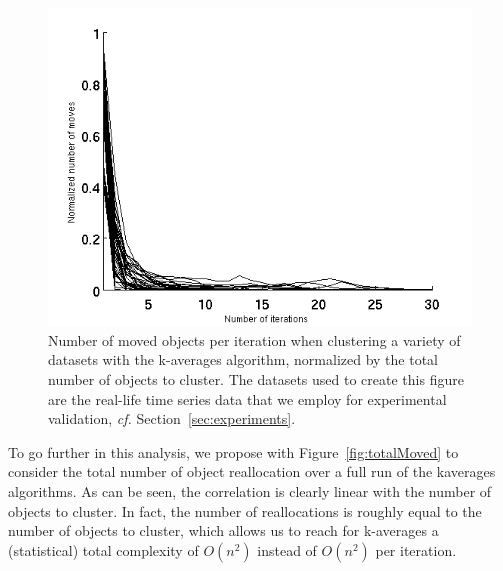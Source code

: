 \documentclass[a4paper,twoside]{article}
\begin{document}
\begin{figure}
\center
\includegraphics[scale=0.6]{figures/iterMove.png} 
\caption{Number of moved objects per iteration when clustering a variety of datasets with the k-averages algorithm, normalized by the total number of objects to cluster. The datasets used to create this figure are the real-life time series data that we employ for experimental validation, \textit{cf.} Section~\ref{sec:experiments}.}
\label{fig:moved}
\end{figure}

To go further in this analysis, we propose with Figure~\ref{fig:totalMoved} to consider the total number of object reallocation over a full run of the kaverages algorithms. As can be seen, the correlation is clearly linear with the number of objects to cluster. In fact, the number of reallocations is roughly equal to the number of objects to cluster, which allows us to reach for k-averages a (statistical) total complexity of $O(n^2)$ instead of $O(n^2)$ per iteration.
\end{document}
